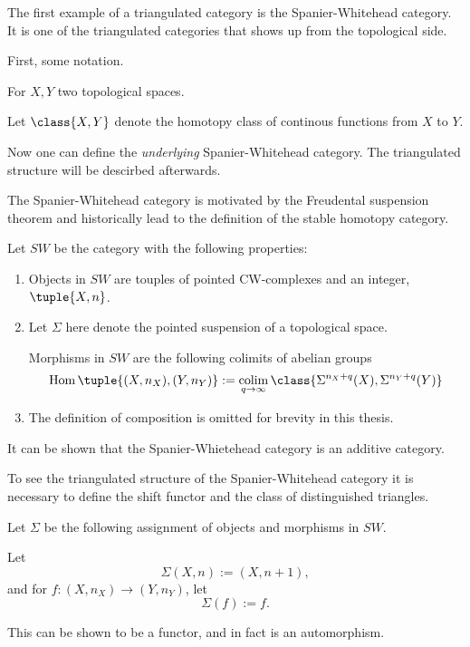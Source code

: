 The first example of a triangulated category is the Spanier-Whitehead category. It is one of the triangulated categories that shows up from the topological side.

First, some notation.
\begin{notation}
    For \( X, Y \) two topological spaces.

    Let \( \class{ X, Y } \) denote the homotopy class of continous functions from \( X \) to \( Y \).
\end{notation}

Now one can define the \emph{underlying} Spanier-Whitehead category. The triangulated structure will be descirbed afterwards.

The Spanier-Whitehead category is motivated by the Freudental suspension theorem and historically lead to the definition of the stable homotopy category.

\begin{definition}
    \label{def:sw-cat}
    Let \( SW \) be the category with the following properties:
    \begin{enumerate}
        \item {
            Objects in \( SW \) are touples of pointed CW-complexes and an integer, \( \tuple{X, n} \).
        }
        \item {
            Let \( \Sigma \) here denote the pointed suspension of a topological space.

            Morphisms in \( SW \) are the following colimits of abelian groups
            \[
                \Hom\tuple{ (X, n_X), (Y, n_Y) } := \colim_{q \to \infty} \class{ \Sigma^{n_X + q}(X), \Sigma^{n_Y + q}(Y) }
            \]
        }
        \item {
            The definition of composition is omitted for brevity in this thesis.
        }
    \end{enumerate}
\end{definition}

It can be shown that the Spanier-Whietehead category is an additive category.

To see the triangulated structure of the Spanier-Whitehead category it is necessary to define the shift functor and the class of distinguished triangles.

\begin{definition}
    \label{def:sw-shift}
    Let \( \Sigma \) be the following assignment of objects and morphisms in \( SW \).

    Let
    \[
        \Sigma(X, n) := (X, n + 1),
    \] 
    and for \( f: (X, n_X) \to (Y, n_Y) \), let
    \[
        \Sigma(f) := f.
    \]

    This can be shown to be a functor, and in fact is an automorphism.
\end{definition}

